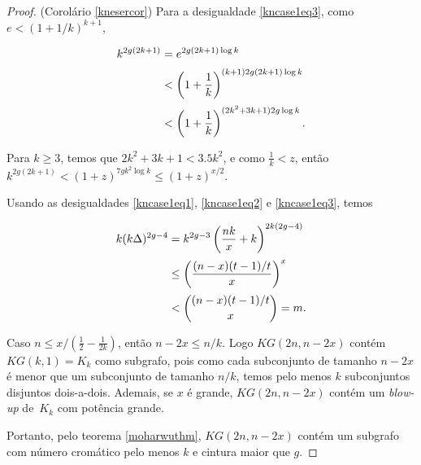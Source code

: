 \documentclass{article}
\begin{document}
\begin{proof}{(Corolário \ref{knesercor})}
Para a desigualdade \ref{kncase1eq3}, como $e < (1+1/k)^{k+1}$,

\begin{equation*}
\setlength{\jot}{5pt}
\begin{aligned}
k^{2g(2k+1)} & = e^{2g(2k+1)\log k}\\
& < \left(1+\frac{1}{k}\right)^{(k+1)2g(2k+1)\log k}\\
& < \left(1+\frac{1}{k}\right)^{(2k^2+3k+1)2g\log k}.
\end{aligned}
\end{equation*}

Para $k \geq 3$, temos que $2k^2+3k+1<3.5k^2$, e como $\frac{1}{k} < z$, então $k^{2g(2k+1)} < (1+z)^{7gk^2\log k} \leq (1+z)^{x/2}$.

Usando as desigualdades \ref{kncase1eq1}, \ref{kncase1eq2} e \ref{kncase1eq3}, temos

\begin{equation*}
\setlength{\jot}{5pt}
\begin{aligned}
k(k\Delta)^{2g-4} & = k^{2g-3}\left(\frac{nk}{x}+k\right)^{2k(2g-4)} \\
 & \leq \left(\frac{(n-x)(t-1)/t}{x}\right)^x \\
 & < \binom{(n-x)(t-1)/t}{x} = m.
\end{aligned}
\end{equation*}


Caso $n \leq x/(\frac{1}{2} - \frac{1}{2k})$, então $n-2x \leq n/k$. Logo $KG(2n,n-2x)$ contém $KG(k,1) = K_k$ como subgrafo, pois como cada subconjunto de tamanho $n-2x$ é menor que um subconjunto de tamanho $n/k$, temos pelo menos $k$ subconjuntos disjuntos dois-a-dois. Ademais, se $x$ é grande, $KG(2n,n-2x)$ contém um \textit{blow-up} de~$K_k$ com potência grande.

Portanto, pelo teorema \ref{moharwuthm}, $KG(2n,n-2x)$ contém um subgrafo com número cromático pelo menos $k$ e cintura maior que $g$.
\end{proof}
\end{document}
